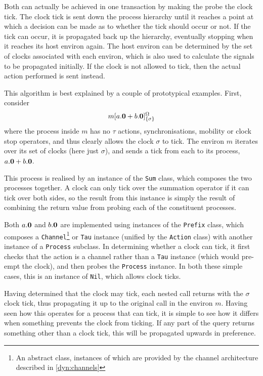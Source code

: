 Both can actually be achieved in one transaction by making the probe the
clock tick.  The clock tick is sent down the process hierarchy until it
reaches a point at which a decision can be made as to whether the tick
should occur or not.  If the tick can occur, it is propagated back up
the hierarchy, eventually stopping when it reaches its host environ
again.  The host environ can be determined by the set of clocks
associated with each environ, which is also used to calculate the
signals to be propagated initially.  If the clock is not allowed to
tick, then the actual action performed is sent instead.

This algorithm is best explained by a couple of prototypical examples.
First, consider 
\begin{displaymath}
{m}[ a.\textbf{0} + b.\textbf{0} ]^{\Omega}_{\{\sigma\}}
\end{displaymath}
where the process inside $m$ has no $\tau$ actions, synchronisations,
mobility or clock stop operators, and thus clearly allows the clock
$\sigma$ to tick.  The environ $m$ iterates over its set of clocks (here
just $\sigma$), and sends a tick from each to its process, $a.\textbf{0} +
b.\textbf{0}$.

This process is realised by an instance of the \texttt{Sum} class, which
composes the two processes together.  A clock can only tick over the
summation operator if it can tick over both sides, so the result from
this instance is simply the result of combining the return value from
probing each of the constituent processes.

Both $a.\textbf{0}$ and $b.\textbf{0}$ are implemented using instances of the
\texttt{Prefix} class, which composes a \texttt{Channel}\footnote{An
abstract class, instances of which are provided by the channel
architecture described in \ref{dyn:channels}} or \texttt{Tau} instance
(unified by the \texttt{Action} class) with another instance of a
\texttt{Process} subclass.  In determining whether a clock can tick, it
first checks that the action is a channel rather than a \texttt{Tau}
instance (which would pre-empt the clock), and then probes the
\texttt{Process} instance.  In both these simple cases, this is an
instance of \texttt{Nil}, which allows clock ticks.

Having determined that the clock may tick, each nested call returns with
the $\sigma$ clock tick, thus propagating it up to the original call in
the environ $m$.  Having seen how this operates for a process that can
tick, it is simple to see how it differs when something prevents the
clock from ticking.  If any part of the query returns something other
than a clock tick, this will be propagated upwards in preference.

